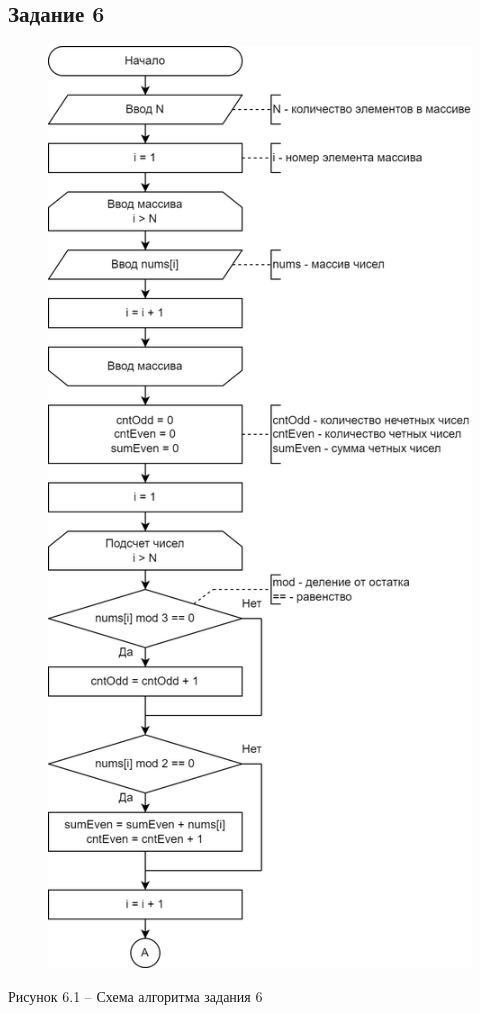 \documentclass[a4paper,14pt]{extarticle}
\begin{document}
  \newpage
  \subsection*{Задание 6}
  \begin{figure}[h]
    \centering
    \includegraphics[width=0.54\linewidth]{schemes/s-6-1}
  \end{figure}
  \begin{center}
    Рисунок 6.1 – Схема алгоритма задания 6
  \end{center}
\end{document}
